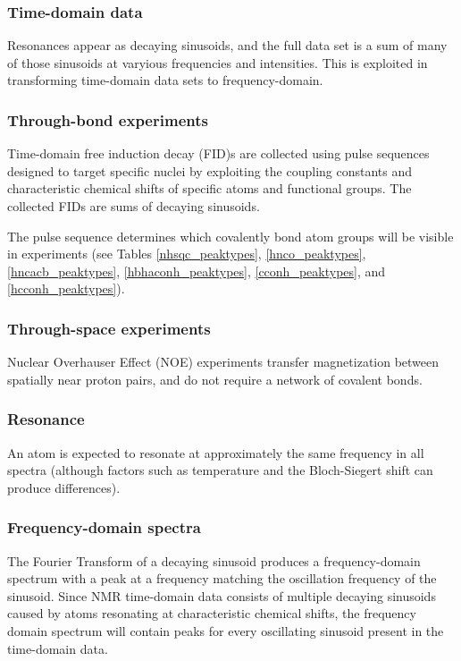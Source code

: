 \subsubsection{Time-domain data}
Resonances appear as decaying sinusoids, and the full data set is a sum of
many of those sinusoids at varyious frequencies and intensities.
This is exploited in transforming time-domain data sets to frequency-domain.

\subsubsection{Through-bond experiments}
Time-domain free induction decay (FID)s are collected using
pulse sequences \cite{khaneja2005} designed to target specific nuclei by
exploiting the coupling constants and characteristic chemical shifts of specific 
atoms and functional groups.  The collected FIDs are sums of decaying sinusoids.

The pulse sequence
determines which covalently bond atom groups will be visible in experiments
(see Tables \ref{nhsqc_peaktypes}, \ref{hnco_peaktypes}, 
\ref{hncacb_peaktypes}, \ref{hbhaconh_peaktypes}, \ref{cconh_peaktypes}, and
\ref{hcconh_peaktypes}).

\subsubsection{Through-space experiments}
Nuclear Overhauser Effect (NOE) experiments transfer magnetization between
spatially near proton pairs, and do not require a network of covalent bonds.

\subsubsection{Resonance}
An atom is expected to resonate at approximately the same frequency in all
spectra (although factors such as temperature and the Bloch-Siegert shift 
can produce differences).

\subsubsection{Frequency-domain spectra}
The Fourier Transform of a decaying sinusoid produces a frequency-domain 
spectrum with a peak at a frequency matching the oscillation frequency of 
the sinusoid.  Since NMR time-domain data consists of multiple decaying 
sinusoids caused by atoms resonating at characteristic chemical shifts, 
the frequency domain spectrum will contain peaks for every oscillating 
sinusoid present in the time-domain data.  

